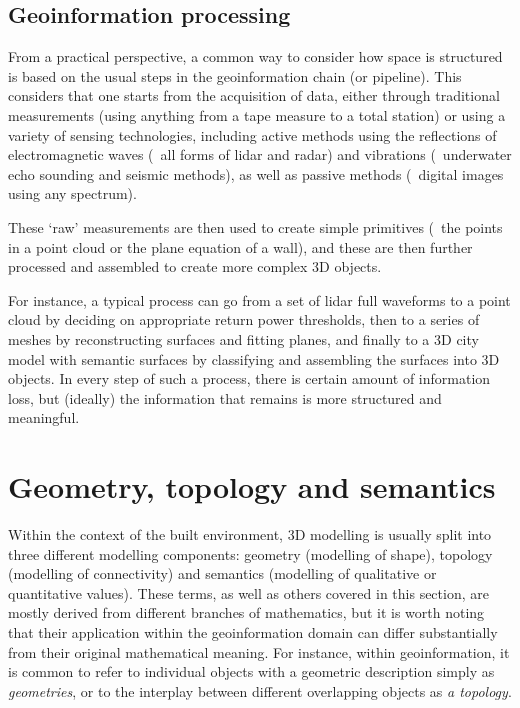 \subsection{Geoinformation processing}

From a practical perspective, a common way to consider how space is structured is based on the usual steps in the geoinformation chain (or pipeline).
This considers that one starts from the acquisition of data, either through traditional measurements (using anything from a tape measure to a total station) or using a variety of sensing technologies, including active methods using the reflections of electromagnetic waves (\eg\ all forms of lidar and radar) and vibrations (\eg\ underwater echo sounding and seismic methods), as well as passive methods (\eg\ digital images using any spectrum).

These `raw' measurements are then used to create simple primitives (\eg\ the points in a point cloud or the plane equation of a wall), and these are then further processed and assembled to create more complex 3D objects.

For instance, a typical process can go from a set of lidar full waveforms to a point cloud by deciding on appropriate return power thresholds, then to a series of meshes by reconstructing surfaces and fitting planes, and finally to a 3D city model with semantic surfaces by classifying and assembling the surfaces into 3D objects.
In every step of such a process, there is certain amount of information loss, but (ideally) the information that remains is more structured and meaningful.

\section{Geometry, topology and semantics}

Within the context of the built environment, 3D modelling is usually split into three different modelling components: geometry (modelling of shape), topology (modelling of connectivity) and semantics (modelling of qualitative or quantitative values).
These terms, as well as others covered in this section, are mostly derived from different branches of mathematics, but it is worth noting that their application within the geoinformation domain can differ substantially from their original mathematical meaning.
For instance, within geoinformation, it is common to refer to individual objects with a geometric description simply as \emph{geometries}, or to the interplay between different overlapping objects as \emph{a topology}.


